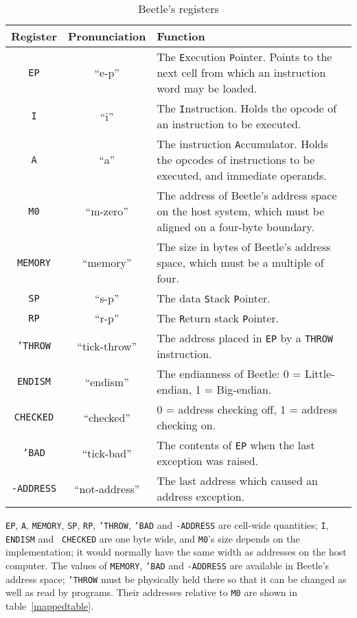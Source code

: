 \documentclass{article}
\newlength{\opcode}\opcode=0.5in
\begin{document}
\begin{table}[htbp]
\begin{center}
\begin{tabular}{|c|c|p{3.75in}|} \hline
\rule[-2mm]{0mm}{6mm}\bf Register & \bf Pronunciation & \bf Function \\
    \hline
{\tt EP} & ``e-p'' & The {\tt E}xecution {\tt P}ointer. Points to the next
    cell from which an instruction word may be loaded. \\ \hline
{\tt I} & ``i'' & The {\tt I}nstruction. Holds the opcode of an instruction
    to be executed. \\ \hline
{\tt A} & ``a'' & The instruction {\tt A}ccumulator. Holds the opcodes of
    instructions to be executed, and immediate operands. \\ \hline
{\tt M0} & ``m-zero'' & The address of Beetle's address space on the host
    system, which must be aligned on a four-byte boundary. \\ \hline
{\tt MEMORY} & ``memory'' & The size in bytes of Beetle's address space,
    which must be a multiple of four. \\ \hline
{\tt SP} & ``s-p'' & The data {\tt S}tack {\tt P}ointer. \\ \hline
{\tt RP} & ``r-p'' & The {\tt R}eturn stack {\tt P}ointer. \\ \hline
{\tt 'THROW} & ``tick-throw'' & The address placed in {\tt EP} by a {\tt THROW}
    instruction. \\ \hline
{\tt ENDISM} & ``endism'' & The endianness of Beetle: 0 = Little-endian,
    1 = Big-endian. \\ \hline
{\tt CHECKED} & ``checked'' & 0 = address checking off, 1 = address checking
    on. \\ \hline
{\tt 'BAD} & ``tick-bad'' & The contents of {\tt EP} when the last exception
    was raised. \\ \hline
{\tt -ADDRESS} & ``not-address'' & The last address which caused an address
    exception. \\ \hline
\end{tabular}
\end{center}
\vspace{-2mm}
\caption{\label{regtable}Beetle's registers}
\end{table}

{\tt EP}, {\tt A}, {\tt MEMORY}, {\tt SP}, {\tt RP}, {\tt 'THROW}, {\tt 'BAD}
and {\tt -ADDRESS} are cell-wide quantities; {\tt I}, {\tt ENDISM} and {\tt
CHECKED} are one byte wide, and {\tt M0}'s size depends on the implementation;
it would normally have the same width as addresses on the host computer. The
values of {\tt MEMORY}, {\tt 'BAD} and {\tt -ADDRESS} are available in Beetle's
address space; {\tt 'THROW} must be physically held there so that it can be
changed as well as read by programs. Their addresses relative to {\tt M0} are
shown in table~\ref{mappedtable}.
\end{document}
